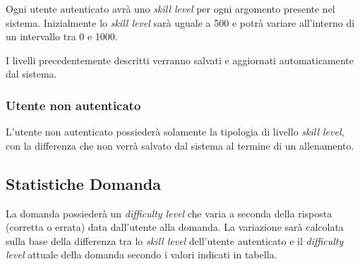 \begin{itemize}
\begin{center}
\end{center}

Ogni utente autenticato avrà uno \textit{skill level} per ogni argomento presente nel sistema.
Inizialmente lo \textit{skill level} sarà uguale a 500 e potrà variare all'interno di un intervallo tra 0 e 1000.
\end{itemize}
I livelli precedentemente descritti verranno salvati e aggiornati automaticamente dal sistema.

\subsubsection{Utente non autenticato}
L'utente non autenticato possiederà solamente la tipologia di livello \textit{skill level}, con la differenza che non verrà salvato dal sistema al termine di un allenamento. 

\subsection{Statistiche Domanda}
La domanda possiederà un \textit{difficulty level} che varia a seconda della risposta (corretta o errata) data dall'utente alla domanda. La variazione sarà calcolata sulla base della differenza tra lo \textit{skill level} dell'utente autenticato e il \textit{difficulty level} attuale della domanda secondo i valori indicati in tabella.


